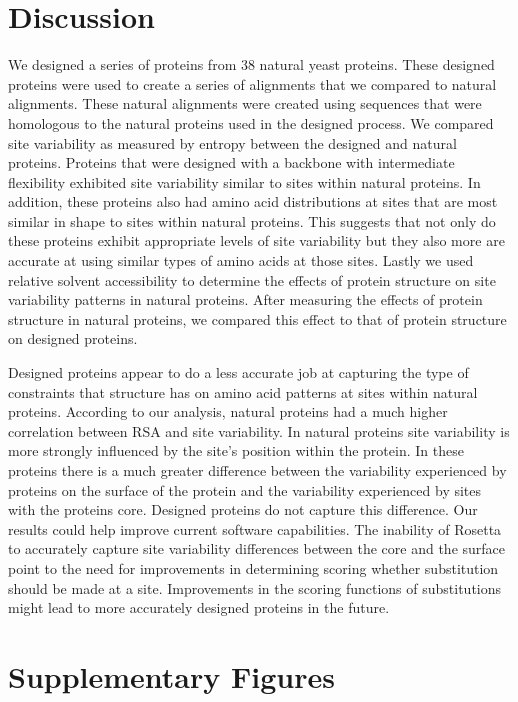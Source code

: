 \documentclass[12pt]{article}
\begin{document}
\section{Discussion}
We designed a series of proteins from 38 natural yeast proteins. These designed proteins were used to create a series of alignments that we compared to natural alignments. These natural alignments were created using sequences that were homologous to the natural proteins used in the designed process.  We compared site variability as measured by entropy between the designed and natural proteins. Proteins that were designed with a backbone with intermediate flexibility exhibited site variability similar to sites within natural proteins. In addition, these proteins also had amino acid distributions at sites that are most similar in shape to sites within natural proteins. This suggests that not only do these proteins exhibit appropriate levels of site variability but they also more are accurate at using similar types of amino acids at those sites.  Lastly we used relative solvent accessibility to determine the effects of protein structure on site variability patterns in natural proteins. After measuring the effects of protein structure in natural proteins, we compared this effect to that of protein structure on designed proteins. 
\par Designed proteins appear to do a less accurate job at capturing the type of constraints that structure has on amino acid patterns at sites within natural proteins. According to our analysis, natural proteins had a much higher correlation between RSA and site variability. In natural proteins site variability is more strongly influenced by the site's position within the protein. In these proteins there is a much greater difference between the variability experienced by proteins on the surface of the protein and the variability experienced by sites with the proteins core. Designed proteins do not capture this difference.  Our results could help improve current software capabilities. The inability of Rosetta to accurately capture site variability differences between the core and the surface point to the need for improvements in determining scoring whether substitution should be made at a site. Improvements in the scoring functions of substitutions might lead to more accurately designed proteins in the future.

\section{Supplementary Figures}
\label{SupFigs}
\end{document}
